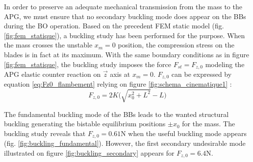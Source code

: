 \documentclass[3p,twocolumn,preprint]{elsarticle}
\begin{document}
In order to preserve an adequate mechanical transmission from the mass to the APG, we must ensure that no secondary buckling mode does appear on the BBs during the BO operation. Based on the precedent FEM static model (fig. \ref{fig:fem_statique}), a buckling study has been performed for the purpose. When the mass crosses the unstable \mbox{$x_m=0$} position, the compression stress on the blades is in fact at its maximum. With the same boundary conditions as in figure \ref{fig:fem_statique}, the buckling study imposes the force $F_{st} = F_{z,0}$ modeling the APG elastic counter reaction on $\vec{z}$ axis at $x_m = 0$. $F_{z,0}$ can be expressed by equation \ref{eq:Fz0_flambement} relying on figure \ref{fig:schema_cinematique1} :
\begin{equation}
	F_{z,0} = 2K \biggl( \sqrt{x_0^2+L^2}-L \biggr)
	\label{eq:Fz0_flambement}
\end{equation}

The fundamental buckling mode of the BBs leads to the wanted structural buckling generating the bistable equilibrium positions $\pm x_0$ for the mass. The buckling study reveals that $F_{z,0}=0.61$N when the useful buckling mode appears (fig. \ref{fig:buckling_fundamental}). However, the first secondary undesirable mode illustrated on figure \ref{fig:buckling_secondary} appears for $F_{z,0}=6.4$N. 
\end{document}
